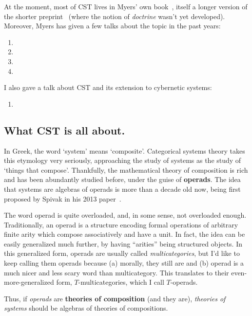 At the moment, most of CST lives in Myers' own book~\cite{myers_categorical_2022}, itself a longer version of the shorter preprint~\cite{myers_double_2020} (where the notion of \emph{doctrine} wasn't yet developed).
Moreover, Myers has given a few talks about the topic in the past years:
\begin{enumerate}
	\item {}
	\item {}
	\item {}
	\item {}
\end{enumerate}
I also gave a talk about CST and its extension to cybernetic systems:
\begin{enumerate}[resume]
	\item {}
\end{enumerate}

\subsection{What CST is all about.}
In Greek, the word `system' means `composite'. Categorical systems theory takes this etymology very seriously, approaching the study of systems as the study of `things that compose'. Thankfully, the mathematical theory of composition is rich and has been abundantly studied before, under the guise of \textbf{operads}. The idea that systems are algebras of operads is more than a decade old now, being first proposed by Spivak in his 2013 paper~\cite{spivak2013operad}.

\begin{remark}
	The word operad is quite overloaded, and, in some sense, not overloaded enough.
	Traditionally, an operad is a structure encoding formal operations of arbitrary finite arity which compose associatively and have a unit. In fact, the idea can be easily generalized much further, by having ``arities'' being structured objects.
	In this generalized form, operads are usually called \emph{multicategories}, but I'd like to keep calling them operads because (a) morally, they still are and (b) operad is a much nicer and less scary word than multicategory.
	This translates to their even-more-generalized form, $T$-multicategories, which I call $T$-operads.
\end{remark}

Thus, if \emph{operads} are \textbf{theories of composition} (and they are), \emph{theories of systems} should be algebras of theories of compositions.

